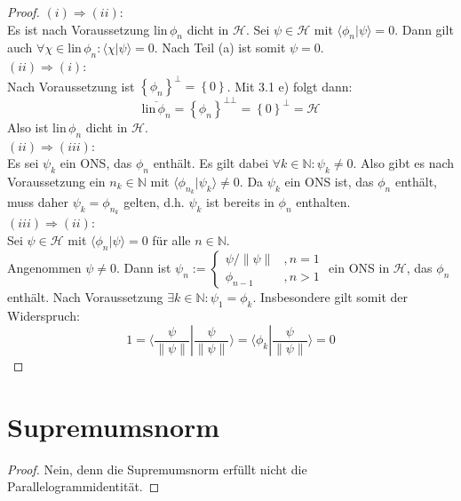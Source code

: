 \documentclass[a4paper,12pt]{article}
\newcommand{\brak}{}
\newcommand{\klammer}{}
\begin{document}
\begin{proof}
$(i)\Rightarrow(ii)$:\\
Es ist nach Voraussetzung $\mathrm{lin\,}\phi_n$ dicht in $\mathcal{H}$. Sei $\psi\in\mathcal{H}$ mit $\brak\langle {\phi_n}| {\psi}\rangle=0$. Dann gilt auch $\forall\chi\in\mathrm{lin\,}\phi_n:\brak\langle {\chi}| {\psi}\rangle=0$. Nach Teil (a) ist somit $\psi=0$. \\
$(ii)\Rightarrow(i)$:\\
Nach Voraussetzung ist $\klammer\left\{ {\phi_n} \right\}^\bot=\klammer\left\{ {0} \right\}$. Mit 3.1 e) folgt dann:
$$\overline{\mathrm{lin\,}\phi_n}=\klammer\left\{ {\phi_n} \right\}^{\bot \bot}=\klammer\left\{ 0  \right\}^\bot=\mathcal{H}$$
Also ist $\mathrm{lin\,}\phi_n$ dicht in $\mathcal{H}$.\\
$(ii)\Rightarrow(iii)$:\\
Es sei $\psi_k$ ein ONS, das $\phi_n$ enthält. Es gilt dabei $\forall k\in\mathbb{N}:\psi_k\neq 0$. Also gibt es nach Voraussetzung ein $n_k\in\mathbb{N}$ mit $\brak\langle {\phi_{n_k}}| {\psi_k}\rangle\neq 0$. Da $\psi_k$ ein ONS ist, das $\phi_n$ enthält, muss daher $\psi_k=\phi_{n_k}$ gelten, d.h. $\psi_k$ ist bereits in $\phi_n$ enthalten.\\
$(iii)\Rightarrow(ii)$:\\
Sei $\psi\in\mathcal{H}$ mit $\brak\langle {\phi_n}| {\psi}\rangle=0$ für alle $n\in\mathbb{N}$. \\
Angenommen $\psi\neq 0$. Dann ist $\psi_n:=\left\{\begin{matrix}
\psi/\|\psi\| &, n=1 \\ \phi_{n-1} &, n> 1
\end{matrix}\right.$ ein ONS in $\mathcal{H}$, das $\phi_n$ enthält. Nach Voraussetzung $\exists k\in\mathbb{N}:\psi_1=\phi_k$. Insbesondere gilt somit der Widerspruch:
$$1=\brak\langle {\frac{\psi}{\|\psi\|}}| {\frac{\psi}{\|\psi\|}}\rangle=\brak\langle {\phi_k}| {\frac{\psi}{\|\psi\|}}\rangle=0$$
\end{proof}
\section{Supremumsnorm}
\begin{proof}
Nein, denn die Supremumsnorm erfüllt nicht die Parallelogrammidentität.
\end{proof}
\end{document}
